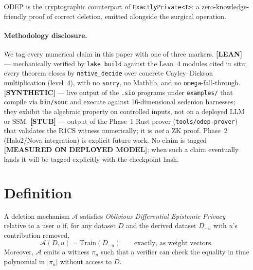 \documentclass{article}
\begin{document}
ODEP is the cryptographic counterpart of \texttt{ExactlyPrivate<T>}: a
zero-knowledge-friendly proof of correct deletion, emitted alongside
the surgical operation.

\paragraph{Methodology disclosure.}
We tag every numerical claim in this paper with one of three markers.
\textbf{[LEAN]} --- mechanically verified by \texttt{lake build} against
the Lean~4 modules cited in situ; every theorem closes by
\texttt{native\_decide} over concrete Cayley--Dickson multiplication
(level~4), with no \texttt{sorry}, no Mathlib, and no \texttt{omega}-fall-through.
\textbf{[SYNTHETIC]} --- live output of the \texttt{.sio} programs under
\texttt{examples/} that compile via \texttt{bin/souc} and execute against
16-dimensional sedenion harnesses; they exhibit the algebraic property on
controlled inputs, not on a deployed LLM or SSM.
\textbf{[STUB]} --- output of the Phase~1 Rust prover (\texttt{tools/odep-prover})
that validates the R1CS witness numerically; it is \emph{not} a ZK proof.
Phase~2 (Halo2/Nova integration) is explicit future work.
No claim is tagged \textbf{[MEASURED ON DEPLOYED MODEL]}; when such a claim
eventually lands it will be tagged explicitly with the checkpoint hash.

\section{Definition}

\begin{definition}[ODEP]
A deletion mechanism $\mathcal{A}$ satisfies \emph{Oblivious
Differential Epistemic Privacy} relative to a user $u$ if, for any
dataset $D$ and the derived dataset $D_{-u}$ with $u$'s contribution
removed,
\[
  \mathcal{A}(D, u) = \mathrm{Train}(D_{-u}) \qquad \text{exactly, as weight vectors.}
\]
Moreover, $\mathcal{A}$ emits a witness $\pi_u$ such that a verifier
can check the equality in time polynomial in $|\pi_u|$ without access
to $D$.
\end{definition}
\end{document}
